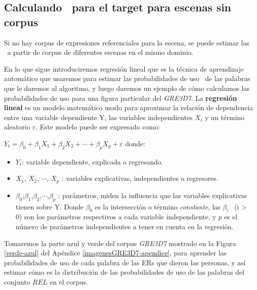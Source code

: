 \subsection{Calculando \puse\ para el target para escenas sin corpus } 
\label{subsec:learning}

%


Si no hay corpus de expresiones referenciales para la escena, se puede estimar las \puse~a partir de corpus de
diferentes escenas en el mismo dominio.

En lo que sigue introduciremos regresi\'on lineal que es la t\'ecnica de aprendizaje autom\'atico que usaremos para estimar las probabilidades de uso \puse\ de las palabras que le daremos al algoritmo, y luego daremos un ejemplo de c\'omo calculamos las probabilidades de uso para una figura particular del \textit{GRE3D7}. La \textbf{regresi\'on lineal} es un modelo matem\'atico usado para aproximar la relaci\'on de dependencia entre una variable dependiente Y, las variables independientes $X_i$ y un t\'ermino aleatorio $\varepsilon$. Este modelo puede ser expresado como:

    $Y_t = \beta_0 + \beta_1 X_1 + \beta_2 X_2 + \cdots +\beta_p X_p + \varepsilon$ donde:
\begin{itemize}
    \item $Y_t$: variable dependiente, explicada o regresando.
    \item $X_1$, $X_2$, $\cdots$, $X_p$ : variables explicativas, independientes o regresores.
    \item $\beta_0$,$\beta_1$,$\beta_2$,$\cdots$,$\beta_p$ : par\'ametros, miden la influencia que las variables explicativas tienen sobre Y. Donde $\beta_0$ es la intersecci\'on o t\'ermino {\it constante}, las $\beta_i$ \ (i > 0) son los par\'ametros respectivos a cada variable independiente, y $p$ es el n\'umero de par\'ametros independientes a tener en cuenta en la regresi\'on.
\end{itemize}
Tomaremos la parte azul y verde del corpus \textit{GRE3D7} mostrado en la Figura \ref{verde-azul} del Ap\'endice \ref{imagenesGRE3D7-apendice}, para aprender las probabilidades de uso de cada palabra de las ERs que dieron las personas, y as\'i estimar c\'omo es la distribuci\'on de las probabilidades de uso de las palabras del conjunto $REL$ en el corpus.

